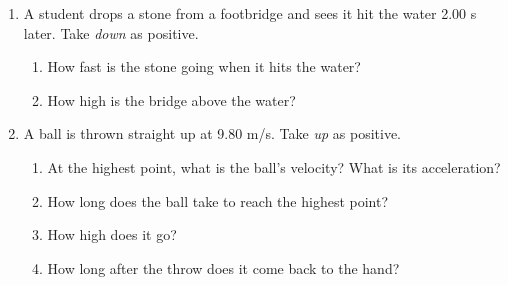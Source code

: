 \documentclass[12pt, twoside]{article}
\begin{document}
\begin{enumerate}[itemsep=0.4cm]
\item A student drops a stone from a footbridge and sees it hit the water 2.00 s
  later. Take \emph{down} as positive.
  \begin{enumerate}[itemsep=0.3cm]
    \item How fast is the stone going when it hits the water?
      \vspace{1.5cm}
    \item How high is the bridge above the water?
      \vspace{1.4cm}
  \end{enumerate}

\item A ball is thrown straight up at 9.80 m/s. Take \emph{up} as positive.
  \begin{enumerate}[itemsep=0.3cm]
    \item At the highest point, what is the ball's velocity? What is its acceleration?
      \vspace{0.8cm}
    \item How long does the ball take to reach the highest point?
      \vspace{1.4cm}
    \item How high does it go?
      \vspace{1.4cm}
    \item How long after the throw does it come back to the hand?
  \end{enumerate}

\end{enumerate}
\end{document}
